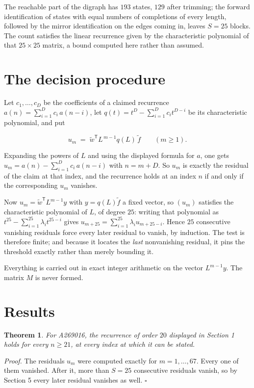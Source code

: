 \documentclass[11pt]{article}
\newtheorem{theorem}{Theorem}
\theoremstyle{definition}
\begin{document}
The reachable part of the digraph has $193$ states, $129$ after trimming; the forward identification of states with equal numbers of completions of every length, followed by the mirror identification on the edges coming in, leaves $S = 25$ blocks. The count satisfies the linear recurrence given by the characteristic polynomial of that $25\times25$ matrix, a bound computed here rather than assumed.

\section{The decision procedure}

Let $c_1,\dots,c_D$ be the coefficients of a claimed recurrence $a(n) = \sum_{i=1}^{D} c_i\,a(n-i)$, let $q(t) = t^{D} - \sum_{i=1}^{D} c_i t^{D-i}$ be its characteristic polynomial, and put

\[u_m \;=\; \tilde w^{\mathsf T} L^{\,m-1} q(L)\,\tilde f \qquad (m \ge 1).\]

Expanding the powers of $L$ and using the displayed formula for $a$, one gets $u_m = a(n) - \sum_{i=1}^{D} c_i\,a(n-i)$ with $n = m + D$. So $u_m$ is exactly the residual of the claim at that index, and the recurrence holds at an index $n$ if and only if the corresponding $u_m$ vanishes.

Now $u_m = \tilde w^{\mathsf T} L^{m-1} y$ with $y = q(L)\tilde f$ a fixed vector, so $(u_m)$ satisfies the characteristic polynomial of $L$, of degree $25$: writing that polynomial as $t^{25} - \sum_{i=1}^{25} \lambda_i t^{25-i}$ gives $u_{m+25} = \sum_{i=1}^{25} \lambda_i u_{m+25-i}$. Hence $25$ consecutive vanishing residuals force every later residual to vanish, by induction. The test is therefore finite; and because it locates the {\itshape last} nonvanishing residual, it pins the threshold exactly rather than merely bounding it.

Everything is carried out in exact integer arithmetic on the vector $L^{m-1}y$. The matrix $M$ is never formed.

\section{Results}

\begin{theorem} For A269016, the recurrence of order $20$ displayed in Section 1 holds for every $n \ge 21$, at every index at which it can be stated.\end{theorem}

{\itshape Proof.} The residuals $u_m$ were computed exactly for $m = 1,\dots,67$. Every one of them vanished. After it, more than $S = 25$ consecutive residuals vanish, so by Section 5 every later residual vanishes as well. $\square$
\end{document}
